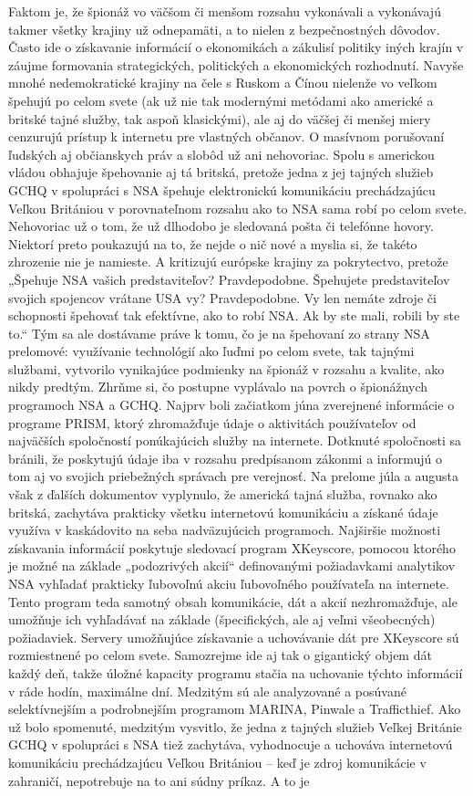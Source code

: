 \documentclass{article}
\begin{document}
\begin{flushleft}
Faktom je, že špionáž vo väčšom či menšom rozsahu vykonávali a vykonávajú takmer všetky krajiny už odnepamäti, a to nielen z bezpečnostných dôvodov. Často ide o získavanie informácií o ekonomikách a zákulisí politiky iných krajín v záujme formovania strategických, politických a ekonomických rozhodnutí. Navyše mnohé nedemokratické krajiny na čele s Ruskom a Čínou nielenže vo veľkom špehujú po celom svete (ak už nie tak modernými metódami ako americké a britské tajné služby, tak aspoň klasickými), ale aj do väčšej či menšej miery cenzurujú prístup k internetu pre vlastných občanov. O masívnom porušovaní ľudských aj občianskych práv a slobôd už ani nehovoriac. Spolu s americkou vládou obhajuje špehovanie aj tá britská, pretože jedna z jej tajných služieb GCHQ v spolupráci s NSA špehuje elektronickú komunikáciu prechádzajúcu Veľkou Britániou v porovnateľnom rozsahu ako to NSA sama robí po celom svete. Nehovoriac už o tom, že už dlhodobo je sledovaná pošta či telefónne hovory. Niektorí preto poukazujú na to, že nejde o nič nové a myslia si, že takéto zhrozenie nie je namieste. A kritizujú európske krajiny za pokrytectvo, pretože „Špehuje NSA vašich predstaviteľov? Pravdepodobne. Špehujete predstaviteľov svojich spojencov vrátane USA vy? Pravdepodobne. Vy len nemáte zdroje či schopnosti špehovať tak efektívne, ako to robí NSA. Ak by ste mali, robili by ste to.“ Tým sa ale dostávame práve k tomu, čo je na špehovaní zo strany NSA prelomové: využívanie technológií ako ľuďmi po celom svete, tak tajnými službami, vytvorilo vynikajúce podmienky na špionáž v rozsahu a kvalite, ako nikdy predtým. Zhrňme si, čo postupne vyplávalo na povrch o špionážnych programoch NSA a GCHQ. Najprv boli začiatkom júna zverejnené informácie o programe PRISM, ktorý zhromažďuje údaje o aktivitách používateľov od najväčších spoločností ponúkajúcich služby na internete. Dotknuté spoločnosti sa bránili, že poskytujú údaje iba v rozsahu predpísanom zákonmi a informujú o tom aj vo svojich priebežných správach pre verejnosť. Na prelome júla a augusta však z ďalších dokumentov vyplynulo, že americká tajná služba, rovnako ako britská, zachytáva prakticky všetku internetovú komunikáciu a získané údaje využíva v kaskádovito na seba nadväzujúcich programoch. Najširšie možnosti získavania informácií poskytuje sledovací program XKeyscore, pomocou ktorého je možné na základe „podozrivých akcií“ definovanými požiadavkami analytikov NSA vyhľadať prakticky ľubovoľnú akciu ľubovoľného používateľa na internete. Tento program teda samotný obsah komunikácie, dát a akcií nezhromažďuje, ale umožňuje ich vyhľadávať na základe (špecifických, ale aj veľmi všeobecných) požiadaviek. Servery umožňujúce získavanie a uchovávanie dát pre XKeyscore sú rozmiestnené po celom svete. Samozrejme ide aj tak o gigantický objem dát každý deň, takže úložné kapacity programu stačia na uchovanie týchto informácií v ráde hodín, maximálne dní. Medzitým sú ale analyzované a posúvané selektívnejším a podrobnejším programom MARINA, Pinwale a Trafficthief. Ako už bolo spomenuté, medzitým vysvitlo, že jedna z tajných služieb Veľkej Británie GCHQ v spolupráci s NSA tiež zachytáva, vyhodnocuje a uchováva internetovú komunikáciu prechádzajúcu Veľkou Britániou – keď je zdroj komunikácie v zahraničí, nepotrebuje na to ani súdny príkaz. A to je 
\end{flushleft}
\end{document}
